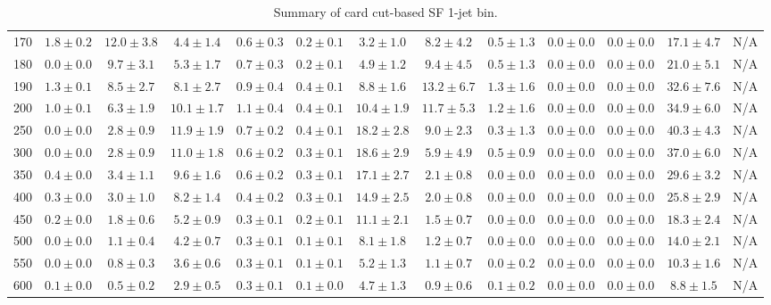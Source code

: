 \begin{table}
{\begin{center}
\begin{tabular}{l | c c | c c c c c c c c  | c c}
170 & $1.8\pm0.2$ & $12.0\pm3.8$ & $4.4\pm1.4$ & $0.6\pm0.3$ & $0.2\pm0.1$ & $3.2\pm1.0$ & $8.2\pm4.2$ & $0.5\pm1.3$ & $0.0\pm0.0$ & $0.0\pm0.0$ & $17.1\pm4.7$ & N/A \\
180 & $0.0\pm0.0$ & $9.7\pm3.1$ & $5.3\pm1.7$ & $0.7\pm0.3$ & $0.2\pm0.1$ & $4.9\pm1.2$ & $9.4\pm4.5$ & $0.5\pm1.3$ & $0.0\pm0.0$ & $0.0\pm0.0$ & $21.0\pm5.1$ & N/A \\
190 & $1.3\pm0.1$ & $8.5\pm2.7$ & $8.1\pm2.7$ & $0.9\pm0.4$ & $0.4\pm0.1$ & $8.8\pm1.6$ & $13.2\pm6.7$ & $1.3\pm1.6$ & $0.0\pm0.0$ & $0.0\pm0.0$ & $32.6\pm7.6$ & N/A \\
200 & $1.0\pm0.1$ & $6.3\pm1.9$ & $10.1\pm1.7$ & $1.1\pm0.4$ & $0.4\pm0.1$ & $10.4\pm1.9$ & $11.7\pm5.3$ & $1.2\pm1.6$ & $0.0\pm0.0$ & $0.0\pm0.0$ & $34.9\pm6.0$ & N/A \\
250 & $0.0\pm0.0$ & $2.8\pm0.9$ & $11.9\pm1.9$ & $0.7\pm0.2$ & $0.4\pm0.1$ & $18.2\pm2.8$ & $9.0\pm2.3$ & $0.3\pm1.3$ & $0.0\pm0.0$ & $0.0\pm0.0$ & $40.3\pm4.3$ & N/A \\
300 & $0.0\pm0.0$ & $2.8\pm0.9$ & $11.0\pm1.8$ & $0.6\pm0.2$ & $0.3\pm0.1$ & $18.6\pm2.9$ & $5.9\pm4.9$ & $0.5\pm0.9$ & $0.0\pm0.0$ & $0.0\pm0.0$ & $37.0\pm6.0$ & N/A \\
350 & $0.4\pm0.0$ & $3.4\pm1.1$ & $9.6\pm1.6$ & $0.6\pm0.2$ & $0.3\pm0.1$ & $17.1\pm2.7$ & $2.1\pm0.8$ & $0.0\pm0.0$ & $0.0\pm0.0$ & $0.0\pm0.0$ & $29.6\pm3.2$ & N/A \\
400 & $0.3\pm0.0$ & $3.0\pm1.0$ & $8.2\pm1.4$ & $0.4\pm0.2$ & $0.3\pm0.1$ & $14.9\pm2.5$ & $2.0\pm0.8$ & $0.0\pm0.0$ & $0.0\pm0.0$ & $0.0\pm0.0$ & $25.8\pm2.9$ & N/A \\
450 & $0.2\pm0.0$ & $1.8\pm0.6$ & $5.2\pm0.9$ & $0.3\pm0.1$ & $0.2\pm0.1$ & $11.1\pm2.1$ & $1.5\pm0.7$ & $0.0\pm0.0$ & $0.0\pm0.0$ & $0.0\pm0.0$ & $18.3\pm2.4$ & N/A \\
500 & $0.0\pm0.0$ & $1.1\pm0.4$ & $4.2\pm0.7$ & $0.3\pm0.1$ & $0.1\pm0.1$ & $8.1\pm1.8$ & $1.2\pm0.7$ & $0.0\pm0.0$ & $0.0\pm0.0$ & $0.0\pm0.0$ & $14.0\pm2.1$ & N/A \\
550 & $0.0\pm0.0$ & $0.8\pm0.3$ & $3.6\pm0.6$ & $0.3\pm0.1$ & $0.1\pm0.1$ & $5.2\pm1.3$ & $1.1\pm0.7$ & $0.0\pm0.2$ & $0.0\pm0.0$ & $0.0\pm0.0$ & $10.3\pm1.6$ & N/A \\
600 & $0.1\pm0.0$ & $0.5\pm0.2$ & $2.9\pm0.5$ & $0.3\pm0.1$ & $0.1\pm0.0$ & $4.7\pm1.3$ & $0.9\pm0.6$ & $0.1\pm0.2$ & $0.0\pm0.0$ & $0.0\pm0.0$ & $8.8\pm1.5$ & N/A \\
\hline
\end{tabular}
\end{center}
}
\caption{Summary of card cut-based SF 1-jet bin.}
\end{table}
